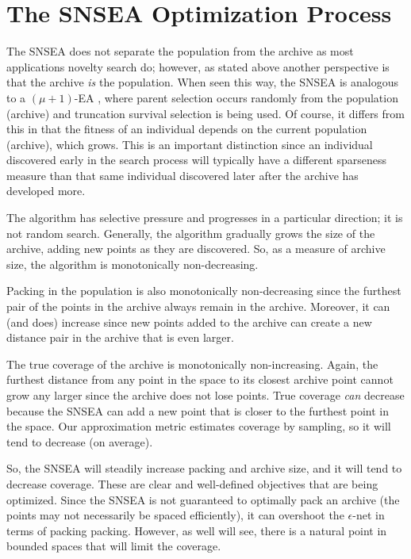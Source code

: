 \documentclass[twoside]{article}
\begin{document}
\section{The SNSEA Optimization Process}
\label{sec:resultssnsea}

The SNSEA does not separate the population from the archive as most applications novelty search do; however, as stated above another perspective is that the archive \emph{is} the population.  When seen this way, the SNSEA is analogous to a $(\mu+1)$-EA \citep{ec:DeJong2006}, where parent selection occurs randomly from the population (archive) and truncation survival selection is being used.  Of course, it differs from this in that the fitness of an individual depends on the current population (archive), which grows.  This is an important distinction since an individual discovered early in the search process will typically have a different sparseness measure than that same individual discovered later after the archive has developed more.

The algorithm has selective pressure and progresses in a particular direction; it is not random search.  Generally, the algorithm gradually grows the size of the archive, adding new points as they are discovered.  So, as a measure of archive size, the algorithm is monotonically non-decreasing.

Packing in the population is also monotonically non-decreasing since the furthest pair of the points in the archive always remain in the archive.  Moreover, it can (and does) increase since new points added to the archive can create a new distance pair in the archive that is even larger.

The true coverage of the archive is monotonically non-increasing.  Again, the furthest distance from any point in the space to its closest archive point cannot grow any larger since the archive does not lose points.  True coverage \emph{can} decrease because the SNSEA can add a new point that is closer to the furthest point in the space.  Our approximation metric estimates coverage by sampling, so it will tend to decrease (on average).  

So, the SNSEA will steadily increase packing and archive size, and it will tend to decrease coverage.  These are clear and well-defined objectives that are being optimized.  Since the SNSEA is not guaranteed to optimally pack an archive (the points may not necessarily be spaced efficiently), it can overshoot the $\epsilon$-net in terms of packing packing.  However, as well will see, there is a natural point in bounded spaces that will limit the coverage.
\end{document}
